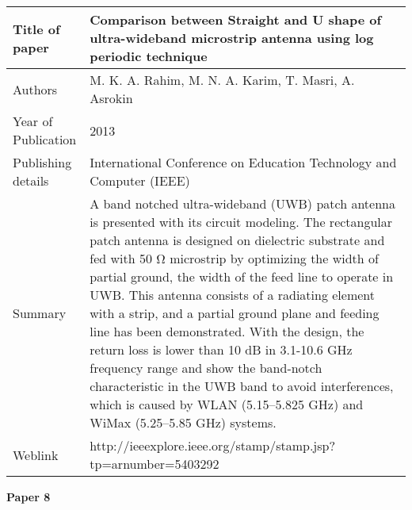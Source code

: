 \documentclass[12pt]{article}
\begin{document}
		  \begin{center}
		  	\begin{table}[H]
		  		\centering
		  		\begin{tabular}{ |l|p{11cm}| }
		  			\hline
		  			Title of paper & Comparison between Straight and U shape of ultra-wideband microstrip antenna using log periodic technique  \\
		  			\hline
		  			Authors & M. K. A. Rahim, M. N. A. Karim, T. Masri, A. Asrokin \\
		  			\hline
		  			Year of Publication & 2013 \\
		  			\hline
		  			Publishing details & International Conference on Education Technology and Computer (IEEE) \\ \hline
		  			Summary & A band notched ultra-wideband (UWB) patch antenna is presented with its circuit modeling. The rectangular patch antenna is designed on dielectric substrate and fed with 50 Ω microstrip by optimizing the width of partial ground, the width of the feed line to operate in UWB. This antenna consists of a radiating element with a strip, and a partial ground plane and feeding line has been demonstrated. With the design, the return loss is lower than 10 dB in 3.1-10.6 GHz frequency range and show the band-notch characteristic in the UWB band to avoid interferences, which is caused by WLAN (5.15–5.825 GHz) and WiMax (5.25–5.85 GHz) systems. \\
		  			\hline
		  			Weblink & http://ieeexplore.ieee.org/stamp/stamp.jsp?tp=arnumber=5403292 \\
		  			\hline			 
		  		\end{tabular}		
		  		
		  	\end{table}
		  \end{center} 
				 
			\begin{flushleft}
				\textbf{Paper 8}
			\end{flushleft}
			
\end{document}
